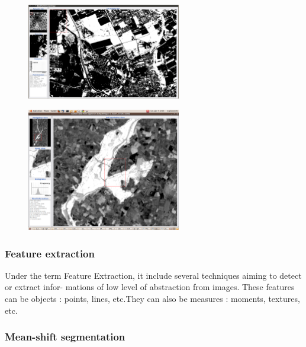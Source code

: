 \begin{figure}
  \center
  \includegraphics[width=0.6\textwidth]{../Art/MonteverdiImages/monteverdi_band_math_result.png}
  \label{fig:bandmathresult}
\end{figure}

\begin{figure}
  \center
  \includegraphics[width=0.6\textwidth]{../Art/MonteverdiImages/monteverdi_NDWI2_substraction.png}
  \label{fig:ndwi2}
\end{figure}

\subsubsection{Feature extraction}

Under the term Feature Extraction, it include several techniques
aiming to detect or extract infor- mations of low level of abstraction
from images. These features can be objects : points, lines, etc.They
can also be measures : moments, textures, etc.

\subsubsection{Mean-shift segmentation}

